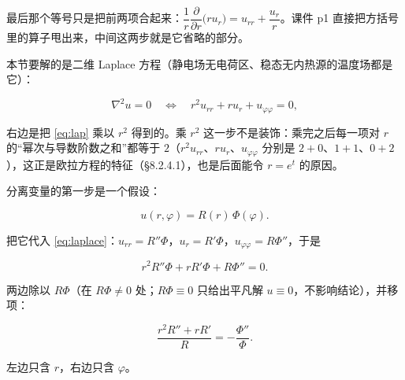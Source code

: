 最后那个等号只是把前两项合起来：$\dfrac1r\dfrac{\partial}{\partial r}\big(r u_r\big)=u_{rr}+\dfrac{u_r}{r}$。课件 p1 直接把方括号里的算子甩出来，中间这两步就是它省略的部分。



本节要解的是二维 Laplace 方程（静电场无电荷区、稳态无内热源的温度场都是它）：

\begin{equation}
\nabla^2u=0\quad\Longleftrightarrow\quad
r^2u_{rr}+ru_r+u_{\varphi\varphi}=0,
\label{eq:laplace}
\end{equation}

右边是把 \eqref{eq:lap} 乘以 $r^2$ 得到的。乘 $r^2$ 这一步不是装饰：乘完之后每一项对 $r$ 的“幂次与导数阶数之和”都等于 $2$（$r^2u_{rr}$、$ru_r$、$u_{\varphi\varphi}$ 分别是 $2+0$、$1+1$、$0+2$），这正是欧拉方程的特征（\S8.2.4.1），也是后面能令 $r=e^t$ 的原因。


\label{sec:822}



分离变量的第一步是一个假设：

\begin{equation}
u(r,\varphi)=R(r)\,\Phi(\varphi).
\label{eq:ansatz}
\end{equation}

把它代入 \eqref{eq:laplace}：$u_{rr}=R''\Phi$，$u_r=R'\Phi$，$u_{\varphi\varphi}=R\Phi''$，于是

\[
r^2R''\Phi+rR'\Phi+R\Phi''=0.
\]

两边除以 $R\Phi$（在 $R\Phi\ne0$ 处；$R\Phi\equiv0$ 只给出平凡解 $u\equiv0$，不影响结论），并移项：

\begin{equation}
\frac{r^2R''+rR'}{R}=-\frac{\Phi''}{\Phi}.
\label{eq:sep}
\end{equation}

左边只含 $r$，右边只含 $\varphi$。


